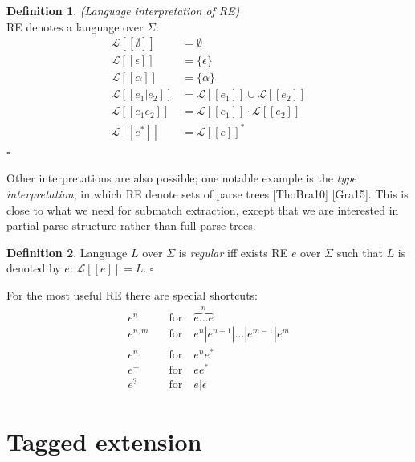\documentclass{article}
\newcommand{\Xeq}{\!=\!}
\newcommand{\Xlb}{[\![}
\newcommand{\Xrb}{]\!]}
\newcommand{\XL}{\mathcal{L}}
\theoremstyle{definition}
\newtheorem{Xdef}{Definition}
\begin{document}
\begin{multicols}{2}
    \begin{Xdef}
    \emph{(Language interpretation of RE)} \\
    RE denotes a language over $\Sigma$:
    \begin{align*}
        \XL \Xlb \emptyset \Xrb &= \emptyset \\
        \XL \Xlb \epsilon \Xrb &= \{ \epsilon \} \\
        \XL \Xlb \alpha \Xrb &= \{\alpha\} \\
        \XL \Xlb e_1 | e_2 \Xrb &= \XL \Xlb e_1 \Xrb \cup \XL \Xlb e_2 \Xrb \\
        \XL \Xlb e_1 e_2 \Xrb &= \XL \Xlb e_1 \Xrb \cdot \XL \Xlb e_2 \Xrb \\
        \XL \Xlb e^* \Xrb &= \XL \Xlb e \Xrb ^*
    \end{align*}
    $\square$
    \end{Xdef}

Other interpretations are also possible;
one notable example is the \emph{type interpretation},
in which RE denote sets of parse trees [ThoBra10] [Gra15].
This is close to what we need for submatch extraction,
except that we are interested in partial parse structure rather than full parse trees.

    \begin{Xdef}
    Language $L$ over $\Sigma$ is \emph{regular} iff exists RE $e$ over $\Sigma$
    such that $L$ is denoted by $e$: $\XL \Xlb e \Xrb \Xeq L$.
    $\square$
    \end{Xdef}

For the most useful RE there are special shortcuts:
    \begin{align*}
        e^n     &\quad\text{for}\quad \overbrace{e \dots e}^{n} \\[-0.5em]
        e^{n,m} &\quad\text{for}\quad e^n | e^{n+1} | \dots | e^{m-1} | e^m \\[-0.5em]
        e^{n,}  &\quad\text{for}\quad e^n e^* \\[-0.5em]
        e^+     &\quad\text{for}\quad ee^* \\[-0.5em]
        e^?     &\quad\text{for}\quad e | \epsilon
    \end{align*}

\section{Tagged extension}\label{section_tagged_extension}


\end{multicols}
\end{document}
